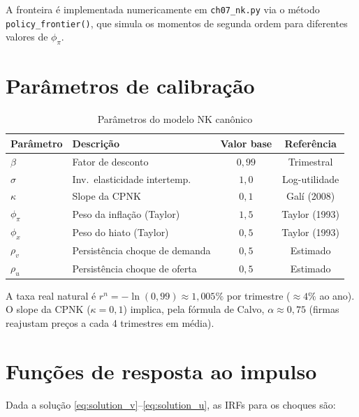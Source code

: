 \documentclass[11pt,a4paper]{article}
\begin{document}
A fronteira é implementada numericamente em \texttt{ch07\_nk.py} via o método
\texttt{policy\_frontier()}, que simula os momentos de segunda ordem para
diferentes valores de $\phi_\pi$.

\section{Parâmetros de calibração}

\begin{table}[h!]
  \centering
  \caption{Parâmetros do modelo NK canônico}
  \begin{tabular}{llcc}
    \toprule
    Parâmetro & Descrição & Valor base & Referência \\
    \midrule
    $\beta$    & Fator de desconto             & $0{,}99$  & Trimestral \\
    $\sigma$   & Inv.\ elasticidade intertemp. & $1{,}0$   & Log-utilidade \\
    $\kappa$   & Slope da CPNK                 & $0{,}1$   & Galí (2008) \\
    $\phi_\pi$ & Peso da inflação (Taylor)     & $1{,}5$   & Taylor (1993) \\
    $\phi_x$   & Peso do hiato (Taylor)        & $0{,}5$   & Taylor (1993) \\
    $\rho_v$   & Persistência choque de demanda & $0{,}5$  & Estimado \\
    $\rho_u$   & Persistência choque de oferta & $0{,}5$   & Estimado \\
    \bottomrule
  \end{tabular}
\end{table}

\noindent A taxa real natural é $r^n = -\ln(0{,}99) \approx 1{,}005\%$ por trimestre
($\approx 4\%$ ao ano). O slope da CPNK ($\kappa = 0{,}1$) implica,
pela fórmula de Calvo, $\alpha \approx 0{,}75$ (firmas reajustam preços
a cada 4 trimestres em média).

\section{Funções de resposta ao impulso}

Dada a solução \eqref{eq:solution_v}--\eqref{eq:solution_u}, as IRFs
para os choques são:
\end{document}
